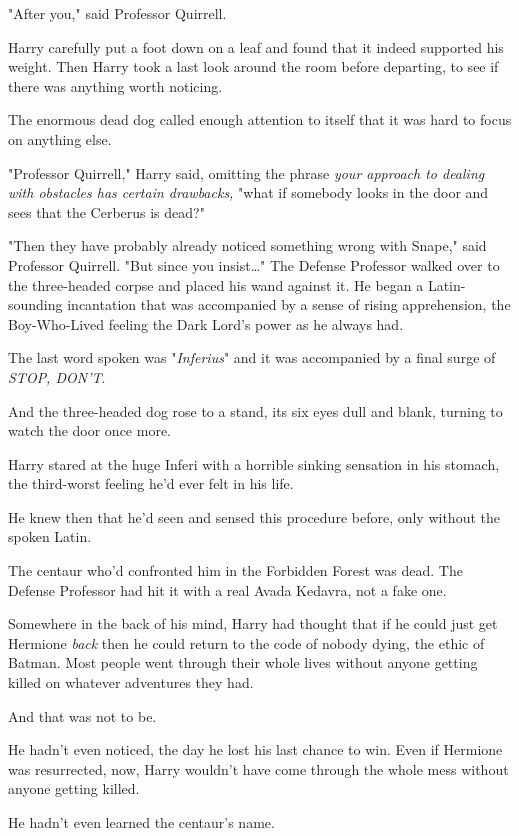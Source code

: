 "After you," said Professor Quirrell.

Harry carefully put a foot down on a leaf and found that it indeed supported 
his weight. Then Harry took a last look around the room before departing, to 
see if there was anything worth noticing.

The enormous dead dog called enough attention to itself that it was hard to 
focus on anything else.

"Professor Quirrell," Harry said, omitting the phrase \emph{your approach to 
dealing with obstacles has certain drawbacks,} "what if somebody looks in the 
door and sees that the Cerberus is dead?"

"Then they have probably already noticed something wrong with Snape," said 
Professor Quirrell. "But since you insist{\ldots}" The Defense Professor walked 
over to the three-headed corpse and placed his wand against it. He began a 
Latin-sounding incantation that was accompanied by a sense of rising 
apprehension, the Boy-Who-Lived feeling the Dark Lord's power as he always had.

The last word spoken was "\emph{Inferius}" and it was accompanied by a final 
surge of \emph{STOP, DON'T}.

And the three-headed dog rose to a stand, its six eyes dull and blank, turning 
to watch the door once more.

Harry stared at the huge Inferi with a horrible sinking sensation in his 
stomach, the third-worst feeling he'd ever felt in his life.

He knew then that he'd seen and sensed this procedure before, only without the 
spoken Latin.

The centaur who'd confronted him in the Forbidden Forest was dead. The Defense 
Professor had hit it with a real Avada Kedavra, not a fake one.

Somewhere in the back of his mind, Harry had thought that if he could just get 
Hermione \emph{back} then he could return to the code of nobody dying, the 
ethic of Batman. Most people went through their whole lives without anyone 
getting killed on whatever adventures they had.

And that was not to be.

He hadn't even noticed, the day he lost his last chance to win. Even if 
Hermione was resurrected, now, Harry wouldn't have come through the whole mess 
without anyone getting killed.

He hadn't even learned the centaur's name.

